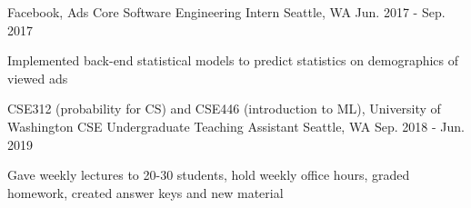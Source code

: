 \begin{cventries}
\begin{comment}
    \vspace{-0.6em}
  \cventry
    {Mode Lab, University of Washington CSE}
    {Undergraduate Research Assistant}
    {Seattle, WA}
    {Mar. 2018 - Sep. 2018}
    {
      \begin{cvitems}
        \item {Studying the application of linear dynamical systems (LDS) on creating sparse models for MEG data.}
        \item {Implemented stochastic gradient descent for inference of LDS using \textit{Python, numpy, Autograd, einsum2}}
      \end{cvitems}
    }
\end{comment}

    \vspace{-1.2em}
  \cventry
    {Facebook, Ads Core}
    {Software Engineering Intern}
    {Seattle, WA}
    {Jun. 2017 - Sep. 2017}
    {
      \begin{cvitems}
    \item {Implemented back-end statistical models to predict statistics on demographics of viewed ads}
      \end{cvitems}
    }
    \vspace{-1.2em}

  \cventry
    {CSE312 (probability for CS) and CSE446 (introduction to ML), University of Washington CSE}
    {Undergraduate Teaching Assistant}
    {Seattle, WA}
    {Sep. 2018 - Jun. 2019}
    {
      \begin{cvitems}
	    \item {Gave weekly lectures to 20-30 students, hold weekly office hours, graded homework, created answer keys and new material}
      \end{cvitems}
    }
    \vspace{-1.2em}

\begin{comment}
  \cventry
    {Ubiquitous Computing Laboratory, University of Washington CSE}
    {Undergraduate Research Assistant}
    {Seattle, WA}
    {Feb. 2016 - Jan. 2018}
    {
      \begin{cvitems}
        \item {Created ML models for error detection in spirometry, inferring lung health from audio, exposed REST api to use models}
	    \item {Created site in Django for collecting and labeling data, met with doctors monthly to coordinate efforts}
        \item {Languages: \textit{Python}. Technologies: \textit{Scikit-learn, Pandas, Tensorflow, Django}}
      \end{cvitems}
    }
    \vspace{-1.2em}
    

\end{comment}
\end{cventries}
